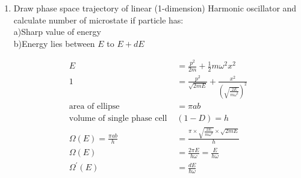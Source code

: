 \begin{enumerate}
\begin{tasks}(4)
	\task[\textbf{a.}]$E^{\left(\frac{3 N}{2}-1\right)} \delta E$
	\task[\textbf{b.}]$E^{\frac{N}{2}} \delta E$
	\task[\textbf{c.}]$N E^{\frac{1}{2}} \delta E$
	\task[\textbf{d.}]$N^{N} \delta E$ 
\end{tasks}
\begin{answer}
	\begin{align*}
	D(E) &\propto E^{(d / s-1)}\\
	\text { Here } d&=3 \mathrm{~N} \text { and } s=2 \text { (massive) }\\
	D(E) &\propto E^{\left(\frac{3 N}{2}-1\right)}
	\end{align*}
	So the correct answer is \textbf{Option (a)}
\end{answer}
\item 
Draw phase space trajectory of linear (1-dimension) Harmonic oscillator and calculate number of microstate if particle has:\\
a)Sharp value of energy\\
b)Energy lies between $E$ to $E+d E$
\begin{answer}
	\begin{align*}
	E&=\frac{p^{2}}{2 m}+\frac{1}{2} m \omega^2 x^{2}\\
	1&=\frac{p^{2}}{\sqrt{2 m E}}+\frac{x^{2}}{\left(\sqrt{\frac{2 E}{m \omega^2}}\right)^{2}}\\
	\text{area of ellipse }&=\pi a b\\
	\text{volume of single phase cell }&(1-D)=h\\
	\Omega(E)=\frac{\pi a b}{h}&=\frac{\pi \times \sqrt{\frac{2 E}{m \omega^2}}  \times \sqrt{2 m E}}{h}\\
	\Omega(E)&=\frac{2 \pi E}{h \omega}=\frac{E}{h \omega}\\
	\Omega^{\prime}(E)&=\frac{d E}{\hbar \omega}
	\end{align*}
\end{answer}	
\end{enumerate}